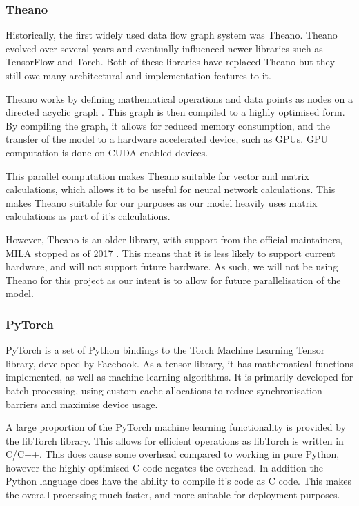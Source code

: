 \subsubsection{Theano}

Historically, the first widely used data flow graph system was Theano. 
Theano evolved over several years and eventually influenced newer libraries such as TensorFlow and Torch.
Both of these libraries have replaced Theano but they still owe many architectural and implementation features to it.

Theano works by defining mathematical operations and data points as nodes on a directed acyclic graph \citep{theano}. 
This graph is then compiled to a highly optimised form.
By compiling the graph, it allows for reduced memory consumption, and the transfer of the model to a hardware accelerated device, such as GPUs.
GPU computation is done on CUDA enabled devices.

This parallel computation makes Theano suitable for vector and matrix calculations, which allows it to be useful for neural network calculations.
This makes Theano suitable for our purposes as our model heavily uses
matrix calculations as part of it's calculations.

However, Theano is an older library, with support from the official maintainers, MILA stopped as of 2017 \citep{milaTheano2017}. 
This means that it is less likely to support current hardware, and will not support future hardware.
As such, we will not be using Theano for this project as our intent is to allow for future parallelisation of the model.




\subsubsection{PyTorch}
PyTorch is a set of Python bindings to the Torch Machine Learning Tensor library, developed by Facebook.
As a tensor library, it has mathematical functions implemented, as well as machine learning algorithms.
It is primarily developed for batch processing, using custom cache allocations to reduce synchronisation barriers and maximise device usage.

A large proportion of the PyTorch machine learning functionality is provided by the libTorch library.
This allows for efficient operations as libTorch is written in C/C++.
This does cause some overhead compared to working in pure Python, however the highly optimised C code negates the overhead.
In addition the Python language does have the ability to compile it's code as C code.
This makes the overall processing much faster, and more suitable for deployment purposes.

